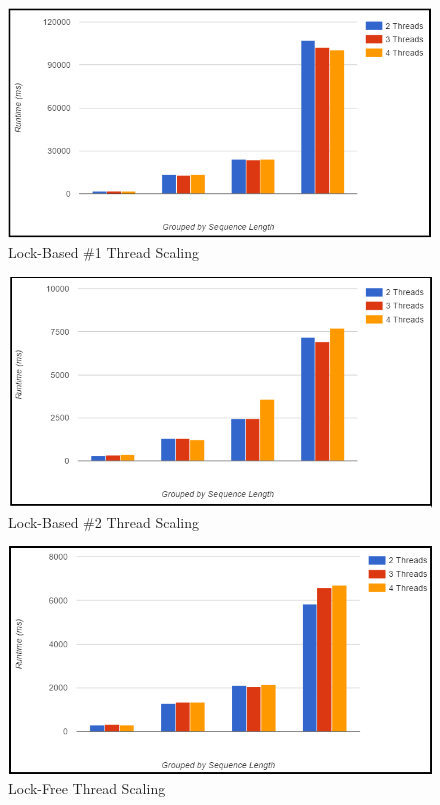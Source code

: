 \documentclass[letterpaper, 10 pt, conference]{IEEEconf}
\begin{document}
\begin{figure}
	\centering
	\includegraphics[scale=0.6]{parallel1}
	\caption{Lock-Based \#1 Thread Scaling} 
\end{figure}

\begin{figure}
	\centering
	\includegraphics[scale=0.6]{parallel2-lock}
	\caption{Lock-Based \#2 Thread Scaling} 
\end{figure}

\begin{figure}
	\centering
	\includegraphics[scale=0.6]{parallel3-lockfree}
	\caption{Lock-Free Thread Scaling} 
\end{figure}




\end{document}
